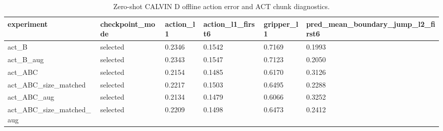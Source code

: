 \begin{table}[t]
\centering
\caption{Zero-shot CALVIN D offline action error and ACT chunk diagnostics.}
\label{tab:zero-shot-d-results}
\begin{tabular}{llllll}
\toprule
experiment & checkpoint\_mode & action\_l1 & action\_l1\_first6 & gripper\_l1 & pred\_mean\_boundary\_jump\_l2\_first6 \\
\midrule
act\_B & selected & 0.2346 & 0.1542 & 0.7169 & 0.1993 \\
act\_B\_aug & selected & 0.2343 & 0.1547 & 0.7123 & 0.2050 \\
act\_ABC & selected & 0.2154 & 0.1485 & 0.6170 & 0.3126 \\
act\_ABC\_size\_matched & selected & 0.2217 & 0.1503 & 0.6495 & 0.2288 \\
act\_ABC\_aug & selected & 0.2134 & 0.1479 & 0.6066 & 0.3252 \\
act\_ABC\_size\_matched\_aug & selected & 0.2209 & 0.1498 & 0.6473 & 0.2412 \\
\bottomrule
\end{tabular}
\end{table}
